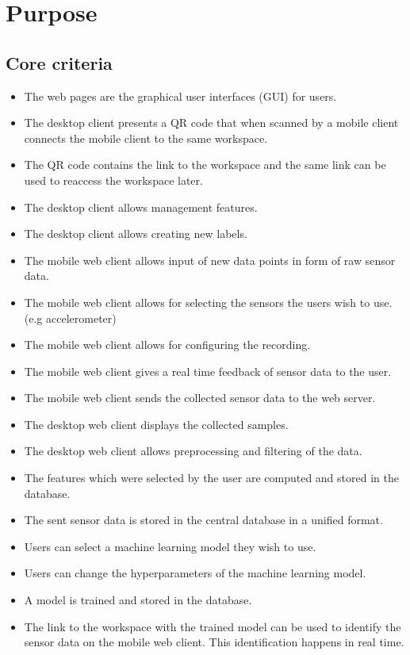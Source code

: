 \section{Purpose}

\subsection{Core criteria}
\begin{itemize}
    \item The web pages are the graphical user interfaces (GUI) for users.
    \item The desktop client presents a QR code that when scanned by a mobile client connects the mobile client to the same \gls{workspace}.
    \item The QR code contains the link to the \gls{workspace} and the same link can be used to reaccess the workspace later.
    \item The desktop client allows management features. %
    \item The desktop client allows creating new labels.
    \item The mobile web client allows input of new data points in form of raw sensor data.
    \item The mobile web client allows for selecting the sensors the users wish to use. (e.g accelerometer)
    \item The mobile web client allows for configuring the recording. %
    \item The mobile web client gives a real time feedback of sensor data to the user.
    \item The mobile web client sends the collected sensor data to the web server. %
    \item The desktop web client displays the collected samples. %
    \item The desktop web client allows preprocessing and filtering of the data.
    \item The features which were selected by the user are computed and stored in the database.
    \item The sent sensor data is stored in the central database in a unified format.
    \item Users can select a machine learning model they wish to use.
    \item Users can change the hyperparameters of the machine learning model.
    \item A model is trained and stored in the database.
    \item The link to the workspace with the trained model can be used to identify the sensor data on the mobile web client. This identification happens in real time.
\end{itemize}

